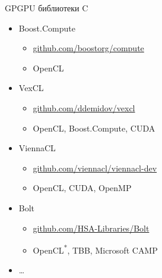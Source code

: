 \documentclass[@BEAMER_OPTIONS@]{beamer}
\newcommand{\CXX}{{\rm C}\plusplus}
\begin{document}
\begin{frame}{GPGPU библиотеки \CXX}
    \begin{itemize}
        \item Boost.Compute
            \begin{itemize}
                \item \href{https://github.com/boostorg/compute}{github.com/boostorg/compute}
                \item OpenCL
            \end{itemize}
        \item VexCL
            \begin{itemize}
                \item \href{https://github.com/ddemidov/vexcl}{github.com/ddemidov/vexcl}
                \item OpenCL, Boost.Compute, CUDA
            \end{itemize}
        \item ViennaCL
            \begin{itemize}
                \item \href{https://github.com/viennacl/viennacl-dev}{github.com/viennacl/viennacl-dev}
                \item OpenCL, CUDA, OpenMP
            \end{itemize}
        \item Bolt
            \begin{itemize}
                \item \href{https://github.com/HSA-Libraries/Bolt}{github.com/HSA-Libraries/Bolt}
                \item OpenCL\textsuperscript{*}, TBB, Microsoft \CXX AMP
            \end{itemize}
        \item \ldots
    \end{itemize}
\end{frame}
\end{document}
